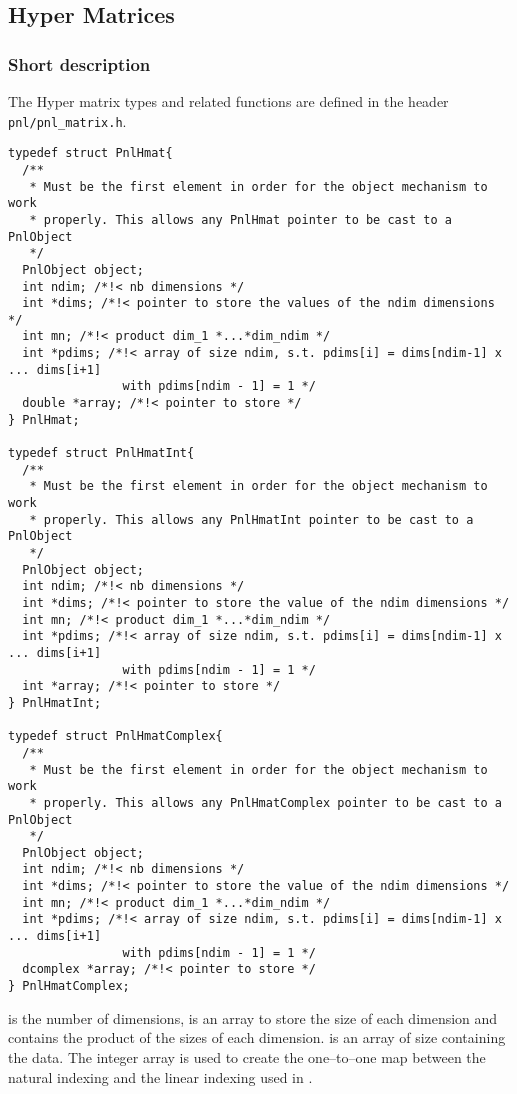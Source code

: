 \subsection{Hyper Matrices}
\subsubsection{Short description}

The Hyper matrix types and related functions are defined in the header \verb!pnl/pnl_matrix.h!.

\begin{verbatim}
typedef struct PnlHmat{
  /**
   * Must be the first element in order for the object mechanism to work
   * properly. This allows any PnlHmat pointer to be cast to a PnlObject
   */
  PnlObject object; 
  int ndim; /*!< nb dimensions */ 
  int *dims; /*!< pointer to store the values of the ndim dimensions */ 
  int mn; /*!< product dim_1 *...*dim_ndim */
  int *pdims; /*!< array of size ndim, s.t. pdims[i] = dims[ndim-1] x ... dims[i+1]
                with pdims[ndim - 1] = 1 */
  double *array; /*!< pointer to store */
} PnlHmat;

typedef struct PnlHmatInt{
  /**
   * Must be the first element in order for the object mechanism to work
   * properly. This allows any PnlHmatInt pointer to be cast to a PnlObject
   */
  PnlObject object; 
  int ndim; /*!< nb dimensions */ 
  int *dims; /*!< pointer to store the value of the ndim dimensions */ 
  int mn; /*!< product dim_1 *...*dim_ndim */
  int *pdims; /*!< array of size ndim, s.t. pdims[i] = dims[ndim-1] x ... dims[i+1]
                with pdims[ndim - 1] = 1 */
  int *array; /*!< pointer to store */
} PnlHmatInt;

typedef struct PnlHmatComplex{
  /**
   * Must be the first element in order for the object mechanism to work
   * properly. This allows any PnlHmatComplex pointer to be cast to a PnlObject
   */
  PnlObject object; 
  int ndim; /*!< nb dimensions */ 
  int *dims; /*!< pointer to store the value of the ndim dimensions */ 
  int mn; /*!< product dim_1 *...*dim_ndim */
  int *pdims; /*!< array of size ndim, s.t. pdims[i] = dims[ndim-1] x ... dims[i+1]
                with pdims[ndim - 1] = 1 */
  dcomplex *array; /*!< pointer to store */
} PnlHmatComplex;
\end{verbatim}
 is the number of dimensions,  is an array to store the
size of each dimension and  contains the product of the sizes of each
dimension.  is an array of size  containing the data. The
integer array  is used to create the one--to--one map between the
natural indexing and the linear indexing used in .



